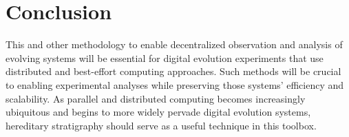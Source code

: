 \section{Conclusion} \label{sec:conclusion}

This and other methodology to enable decentralized observation and analysis of evolving systems will be essential for digital evolution experiments that use distributed and best-effort computing approaches.
Such methods will be crucial to enabling experimental analyses while preserving those systems' efficiency and scalability.
As parallel and distributed computing becomes increasingly ubiquitous and begins to more widely pervade digital evolution systems, hereditary stratigraphy should serve as a useful technique in this toolbox.
